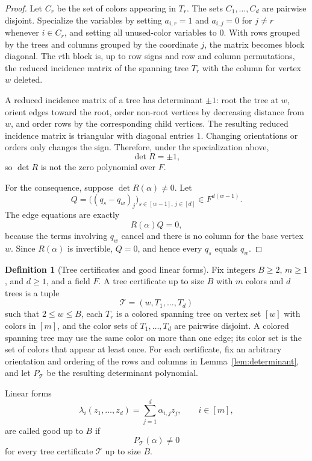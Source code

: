 \documentclass{amsart}
\theoremstyle{definition}
\newtheorem{definition}[theorem]{Definition}
\theoremstyle{remark}
\begin{document}
\begin{proof}
Let \(C_r\) be the set of colors appearing in \(T_r\). The sets \(C_1,\ldots,C_d\) are pairwise disjoint. Specialize the variables by setting \(a_{i,r}=1\) and \(a_{i,j}=0\) for \(j\ne r\) whenever \(i\in C_r\), and setting all unused-color variables to \(0\). With rows grouped by the trees and columns grouped by the coordinate \(j\), the matrix becomes block diagonal. The \(r\)th block is, up to row signs and row and column permutations, the reduced incidence matrix of the spanning tree \(T_r\) with the column for vertex \(w\) deleted.

A reduced incidence matrix of a tree has determinant \(\pm1\): root the tree at \(w\), orient edges toward the root, order non-root vertices by decreasing distance from \(w\), and order rows by the corresponding child vertices. The resulting reduced incidence matrix is triangular with diagonal entries \(1\). Changing orientations or orders only changes the sign. Therefore, under the specialization above,
\[
\det R=\pm1,
\]
so \(\det R\) is not the zero polynomial over \(F\).

For the consequence, suppose \(\det R(\alpha)\ne0\). Let
\[
Q=\bigl((q_s-q_w)_j\bigr)_{s\in[w-1],\,j\in[d]}\in F^{d(w-1)}.
\]
The edge equations are exactly
\[
R(\alpha)Q=0,
\]
because the terms involving \(q_w\) cancel and there is no column for the base vertex \(w\). Since \(R(\alpha)\) is invertible, \(Q=0\), and hence every \(q_s\) equals \(q_w\).
\end{proof}

\begin{definition}[Tree certificates and good linear forms]\label{def:good}
Fix integers \(B\ge2\), \(m\ge1\), and \(d\ge1\), and a field \(F\). A tree certificate up to size \(B\) with \(m\) colors and \(d\) trees is a tuple
\[
\mathcal T=(w,T_1,\ldots,T_d)
\]
such that \(2\le w\le B\), each \(T_r\) is a colored spanning tree on vertex set \([w]\) with colors in \([m]\), and the color sets of \(T_1,\ldots,T_d\) are pairwise disjoint. 
A colored spanning tree may use the same color on more than one edge; its color set is the set of colors that appear at least once.
For each certificate, fix an arbitrary orientation and ordering of the rows and columns in Lemma~\ref{lem:determinant}, and let \(P_{\mathcal T}\) be the resulting determinant polynomial.

Linear forms
\[
\lambda_i(z_1,\ldots,z_d)=\sum_{j=1}^d \alpha_{i,j}z_j,
\qquad i\in[m],
\]
are called good up to \(B\) if
\[
P_{\mathcal T}(\alpha)\ne0
\]
for every tree certificate \(\mathcal T\) up to size \(B\).
\end{definition}
\end{document}
